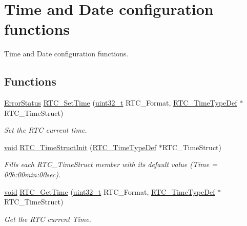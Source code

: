 \hypertarget{group___r_t_c___group2}{\section{Time and Date configuration functions}
\label{group___r_t_c___group2}
}


Time and Date configuration functions.  


\subsection*{Functions}
\begin{DoxyCompactItemize}
\item 
\hyperlink{group___exported__types_ga8333b96c67f83cba354b3407fcbb6ee8}{Error\-Status} \hyperlink{group___r_t_c___group2_ga9f9df80cfa82f7a4dd9f4d0cf2ffb3a6}{R\-T\-C\-\_\-\-Set\-Time} (\hyperlink{stdint_8h_a435d1572bf3f880d55459d9805097f62}{uint32\-\_\-t} R\-T\-C\-\_\-\-Format, \hyperlink{struct_r_t_c___time_type_def}{R\-T\-C\-\_\-\-Time\-Type\-Def} $\ast$R\-T\-C\-\_\-\-Time\-Struct)
\begin{DoxyCompactList}\small\item\em Set the R\-T\-C current time. \end{DoxyCompactList}\item 
\hyperlink{group___n_a_m_e_ga18028b8badbf1ea7e704ccac3c488e82}{void} \hyperlink{group___r_t_c___group2_ga0404db6e0c70e5a6bbbe4fa58a577365}{R\-T\-C\-\_\-\-Time\-Struct\-Init} (\hyperlink{struct_r_t_c___time_type_def}{R\-T\-C\-\_\-\-Time\-Type\-Def} $\ast$R\-T\-C\-\_\-\-Time\-Struct)
\begin{DoxyCompactList}\small\item\em Fills each R\-T\-C\-\_\-\-Time\-Struct member with its default value (Time = 00h\-:00min\-:00sec). \end{DoxyCompactList}\item 
\hyperlink{group___n_a_m_e_ga18028b8badbf1ea7e704ccac3c488e82}{void} \hyperlink{group___r_t_c___group2_ga1fcc101339c77aebd25ec3621fd1b61a}{R\-T\-C\-\_\-\-Get\-Time} (\hyperlink{stdint_8h_a435d1572bf3f880d55459d9805097f62}{uint32\-\_\-t} R\-T\-C\-\_\-\-Format, \hyperlink{struct_r_t_c___time_type_def}{R\-T\-C\-\_\-\-Time\-Type\-Def} $\ast$R\-T\-C\-\_\-\-Time\-Struct)
\begin{DoxyCompactList}\small\item\em Get the R\-T\-C current Time. \end{DoxyCompactList}\item 

\end{DoxyCompactItemize}
